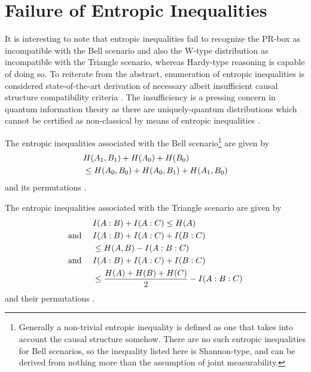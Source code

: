 
\section{Failure of Entropic Inequalities}

It is interesting to note that entropic inequalities \cite{fritz2013marginal,chaves2014novel} fail to recognize the PR-box as incompatible with the Bell scenario and also the W-type distribution as incompatible with the Triangle scenario, whereas Hardy-type reasoning is capable of doing so. To reiterate from the abstract, enumeration of entropic inequalities is considered state-of-the-art derivation of necessary albeit insufficient causal structure compatibility criteria \cite{pusey2014gdag}. The insufficiency is a pressing concern in quantum information theory as there are uniquely-quantum distributions which cannot be certified as non-classical by means of entropic inequalities \cite{fritz2012bell}. 

The entropic inequalities associated with the Bell scenario\footnote{Generally a non-trivial entropic inequality is defined as one that takes into account the causal structure somehow. There are no such entropic inequalities for Bell scenarios, so the inequality listed here is Shannon-type, and can be derived from nothing more than the assumption of joint measurability.} are given by
\begin{align}\begin{split}\label{eq:entropicCHSH}
&H\lparen A_1,B_1\rparen+H\lparen A_0\rparen+H\lparen B_0\rparen
\\&\leq H\lparen A_0,B_0\rparen+H\lparen A_0,B_1\rparen+H\lparen A_1,B_0\rparen
\end{split}\end{align}
and its permutations \cite{chaves2014novel,chaves2012entropic}.

The entropic inequalities associated with the Triangle scenario are given by 
\begin{align}\begin{split}\label{eq:entropicineqs}
&I\lparen A:B\rparen+I\lparen A:C\rparen\leq H\lparen A\rparen \\
\text{and }\quad&I\lparen A:B\rparen+I\lparen A:C\rparen+I\lparen B:C\rparen\\
& \leq H\lparen A,B\rparen-I\lparen A:B:C\rparen\\
\text{and }\quad & I\lparen A:B\rparen+I\lparen A:C\rparen+I\lparen B:C\rparen
\\& \leq\frac{H\lparen A\rparen+H\lparen B\rparen+H\lparen C\rparen}{2}-I\lparen A:B:C\rparen
\end{split}\end{align}
and their permutations \cite{chaves2014novel,Chaves2015infoquantum,pusey2014gdag}.

